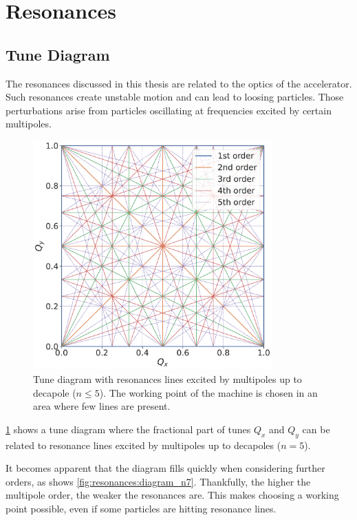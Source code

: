 \section{Resonances}


\subsection{Tune Diagram}

The resonances discussed in this thesis are related to the optics of the accelerator.
Such resonances create unstable motion and can lead to loosing particles.
Those perturbations arise from particles oscillating at frequencies excited by certain multipoles.

\begin{figure}[H]
    \centering
    \includegraphics[width=0.82\textwidth]{images/resonance_diagram_n5.pdf}
    \caption{Tune diagram with resonances lines excited by multipoles up to decapole ($n \leq 5$).
             The working point of the machine is chosen in an area where few lines are present.}
    \label{fig:resonances:diagram_n5}
\end{figure}

\cref{fig:resonances:diagram_n5} shows a tune diagram where the fractional part of tunes $Q_x$ and
$Q_y$ can be related to resonance lines excited by multipoles up to decapoles ($n=5$).

It becomes apparent that the diagram fills quickly when considering further orders, as shows
\cref{fig:resonances:diagram_n7}. Thankfully, the higher the multipole order, the weaker the
resonances are. This makes choosing a working point possible, even if some particles are hitting
resonance lines.

